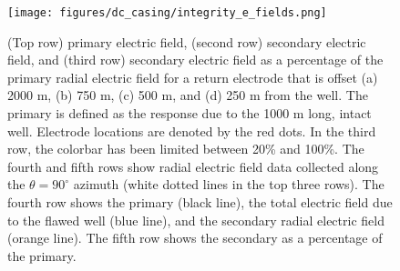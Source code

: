 \begin{figure}
    \begin{center}
    \texttt{[image: figures/dc\_casing/integrity\_e\_fields.png]}
    \end{center}
\caption{
    (Top row) primary electric field, (second row) secondary electric field,
    and (third row) secondary electric field as a percentage of the primary radial electric field
    for a return electrode that is offset (a) 2000 m, (b) 750 m, (c) 500 m, and (d) 250 m
    from the well. The primary is defined as the response due to the 1000 m
    long, intact well. Electrode locations are denoted by
    the red dots. In the third row, the colorbar has been limited
    between 20\% and 100\%. The fourth and fifth rows show radial electric field data
    collected along the $\theta=90^\circ$ azimuth (white dotted lines in
    the top three rows). The fourth row shows the primary (black line), the total
    electric field due to the flawed well (blue line), and the secondary
    radial electric field (orange line). The fifth row shows the secondary as a
    percentage of the primary.
}
\label{fig:integrity_e_fields}
\end{figure}
